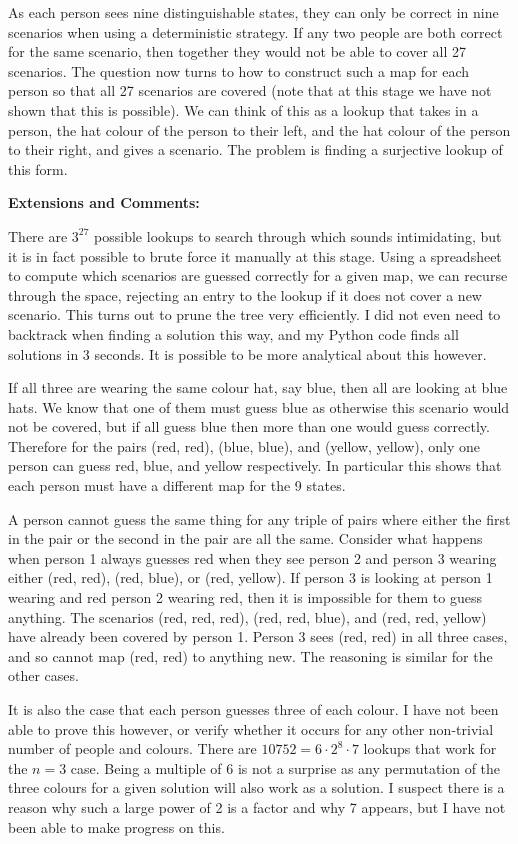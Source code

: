 As each person sees nine distinguishable states, they can only be correct in nine scenarios when using a deterministic strategy. If any two people are both correct for the same scenario, then together they would not be able to cover all 27 scenarios. The question now turns to how to construct such a map for each person so that all 27 scenarios are covered (note that at this stage we have not shown that this is possible). We can think of this as a lookup that takes in a person, the hat colour of the person to their left, and the hat colour of the person to their right, and gives a scenario. The problem is finding a surjective lookup of this form.



\textbf{Extensions and Comments:}

There are $3^{27}$ possible lookups to search through which sounds intimidating, but it is in fact possible to brute force it manually at this stage. Using a spreadsheet to compute which scenarios are guessed correctly for a given map, we can recurse through the space, rejecting an entry to the lookup if it does not cover a new scenario. This turns out to prune the tree very efficiently. I did not even need to backtrack when finding a solution this way, and my Python code finds all solutions in 3 seconds. It is possible to be more analytical about this however.

If all three are wearing the same colour hat, say blue, then all are looking at blue hats. We know that one of them must guess blue as otherwise this scenario would not be covered, but if all guess blue then more than one would guess correctly. Therefore for the pairs (red, red), (blue, blue), and (yellow, yellow), only one person can guess red, blue, and yellow respectively. In particular this shows that each person must have a different map for the 9 states.

A person cannot guess the same thing for any triple of pairs where either the first in the pair or the second in the pair are all the same. Consider what happens when person 1 always guesses red when they see person 2 and person 3 wearing either (red, red), (red, blue), or (red, yellow). If person 3 is looking at person 1 wearing and red person 2 wearing red, then it is impossible for them to guess anything. The scenarios (red, red, red), (red, red, blue), and (red, red, yellow) have already been covered by person 1. Person 3 sees (red, red) in all three cases, and so cannot map (red, red) to anything new. The reasoning is similar for the other cases.

It is also the case that each person guesses three of each colour. I have not been able to prove this however, or verify whether it occurs for any other non-trivial number of people and colours. There are $10752 = 6 \cdot 2^8 \cdot 7$ lookups that work for the $n = 3$ case. Being a multiple of 6 is not a surprise as any permutation of the three colours for a given solution will also work as a solution. I suspect there is a reason why such a large power of 2 is a factor and why 7 appears, but I have not been able to make progress on this.